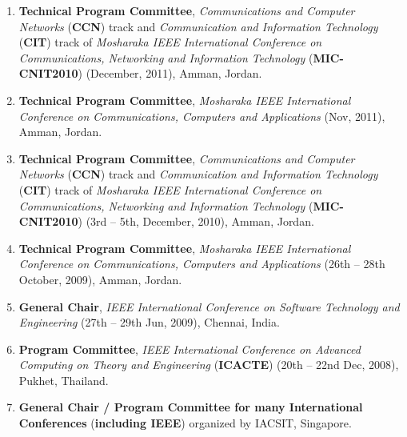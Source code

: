 \begin{enumerate}
\item
\textbf{Technical Program Committee}, \textit{Communications and Computer Networks} (\textbf{CCN}) track and \textit{Communication and Information Technology} (\textbf{CIT}) track of\textit{ Mosharaka IEEE International Conference on Communications, Networking and Information Technology} (\textbf{MIC-CNIT2010}) (December, 2011), Amman, Jordan.

\item
\textbf{Technical Program Committee}, \textit{Mosharaka IEEE International Conference on Communications, Computers and Applications} (Nov, 2011), Amman, Jordan.

\item
\textbf{Technical Program Committee}, \textit{Communications and Computer Networks} (\textbf{CCN}) track and \textit{Communication and Information Technology} (\textbf{CIT}) track of \textit{Mosharaka IEEE International Conference on Communications, Networking and Information Technology} (\textbf{MIC-CNIT2010}) (3rd – 5th, December, 2010), Amman, Jordan.

\item
\textbf{Technical Program Committee}, \textit{Mosharaka IEEE International Conference on Communications, Computers and Applications} (26th – 28th October, 2009), Amman, Jordan.

\item
\textbf{General Chair}, \textit{IEEE International Conference on Software Technology and Engineering} (27th – 29th Jun, 2009), Chennai, India.

\item 
\textbf{Program Committee},\textit{ IEEE International Conference on Advanced Computing on Theory and Engineering} (\textbf{ICACTE}) (20th – 22nd Dec, 2008), Pukhet, Thailand. 

\item
\textbf{General Chair / Program Committee for many International Conferences} (\textbf{including IEEE}) organized by IACSIT, Singapore.

\end{enumerate}